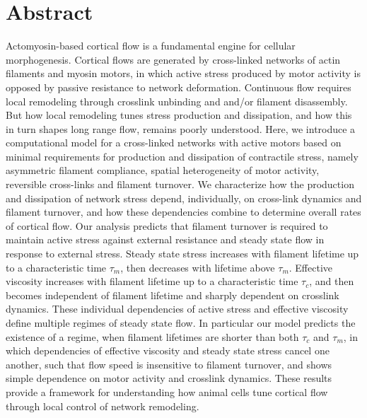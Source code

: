 \documentclass[10pt,letterpaper]{article}
\begin{document}
\section*{Abstract}
Actomyosin-based cortical flow is a fundamental engine for cellular morphogenesis.  Cortical flows are generated by cross-linked networks of actin filaments and myosin motors, in which active stress produced by motor activity is opposed by passive resistance to network deformation.  Continuous flow requires local remodeling through crosslink unbinding and and/or filament disassembly. But how local remodeling tunes stress production and dissipation, and how this in turn shapes long range flow, remains poorly understood. Here, we introduce a computational model for a cross-linked networks with active motors based on minimal requirements for production and dissipation of contractile stress, namely asymmetric filament compliance, spatial heterogeneity of motor activity, reversible cross-links and filament turnover.  We characterize how the production and dissipation of network stress depend, individually, on cross-link dynamics and filament turnover, and how these dependencies combine to determine overall rates of cortical flow. Our analysis predicts that filament turnover is required to maintain active stress against external resistance and steady state flow in response to external stress. Steady state stress increases with filament lifetime up to a characteristic time $\tau_{m}$, then decreases with lifetime above $\tau_{m}$.   Effective viscosity increases with filament lifetime up to a characteristic time $\tau_c$, and then becomes independent of filament lifetime and sharply dependent on crosslink dynamics.  These individual dependencies of active stress and effective viscosity define multiple regimes of steady state flow.  In particular our model predicts the existence of a regime, when filament lifetimes are shorter than both $\tau_c$ and $\tau_{m}$, in which dependencies of effective viscosity and steady state stress cancel one another, such that flow speed is insensitive to filament turnover, and shows simple dependence on motor activity and crosslink dynamics.  These results provide a framework for understanding how animal cells tune cortical flow through local control of network remodeling.

\end{document}
